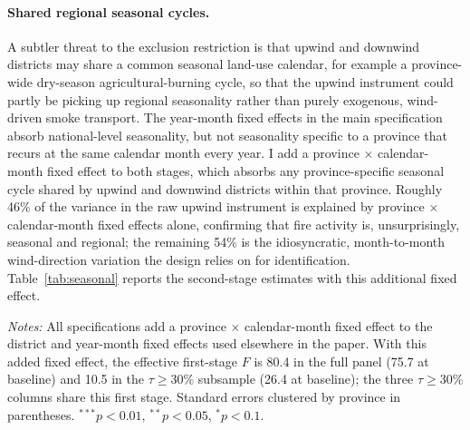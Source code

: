 \documentclass[12pt]{article}
\begin{document}
\paragraph{Shared regional seasonal cycles.} A subtler threat to the exclusion restriction is that upwind and downwind districts may share a common seasonal land-use calendar, for example a province-wide dry-season agricultural-burning cycle, so that the upwind instrument could partly be picking up regional seasonality rather than purely exogenous, wind-driven smoke transport. The year-month fixed effects in the main specification absorb national-level seasonality, but not seasonality specific to a province that recurs at the same calendar month every year. I add a province $\times$ calendar-month fixed effect to both stages, which absorbs any province-specific seasonal cycle shared by upwind and downwind districts within that province. Roughly 46\% of the variance in the raw upwind instrument is explained by province $\times$ calendar-month fixed effects alone, confirming that fire activity is, unsurprisingly, seasonal and regional; the remaining 54\% is the idiosyncratic, month-to-month wind-direction variation the design relies on for identification. Table~\ref{tab:seasonal} reports the second-stage estimates with this additional fixed effect.

\begin{table}[H]
\centering
\caption{Robustness to province $\times$ calendar-month fixed effects}
\label{tab:seasonal}
\begin{minipage}{0.95\textwidth}
\vspace{4pt}
\footnotesize \emph{Notes:} All specifications add a province $\times$ calendar-month fixed effect to the district and year-month fixed effects used elsewhere in the paper. With this added fixed effect, the effective first-stage $F$ \citep{montielolea2013} is 80.4 in the full panel (75.7 at baseline) and 10.5 in the $\tau \geq 30\%$ subsample (26.4 at baseline); the three $\tau \geq 30\%$ columns share this first stage. Standard errors clustered by province in parentheses. $^{***}p<0.01$, $^{**}p<0.05$, $^{*}p<0.1$.
\end{minipage}
\end{table}
\end{document}
